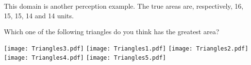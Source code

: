
This domain is another perception example.
The true areas are, respectively, 16, 15, 15, 14 and 14 units.

\begin{tcolorbox}
	Which one of the following triangles do you think has the greatest area?

	\texttt{[image: Triangles3.pdf]}
	\texttt{[image: Triangles1.pdf]}
	\texttt{[image: Triangles2.pdf]}
	\texttt{[image: Triangles4.pdf]}
	\texttt{[image: Triangles5.pdf]}	
\end{tcolorbox}
